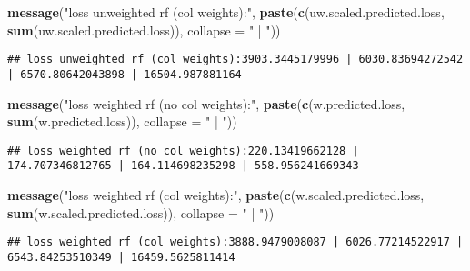 \documentclass[10pt]{report}
\newenvironment{Shaded}{}{}
\newcommand{\KeywordTok}[1]{\textcolor[rgb]{0.00,0.44,0.13}{\textbf{{#1}}}}
\newcommand{\DataTypeTok}[1]{\textcolor[rgb]{0.56,0.13,0.00}{{#1}}}
\newcommand{\StringTok}[1]{\textcolor[rgb]{0.25,0.44,0.63}{{#1}}}
\newcommand{\NormalTok}[1]{{#1}}
\begin{document}
\begin{Shaded}
\begin{Highlighting}[]
\KeywordTok{message}\NormalTok{(}\StringTok{"loss unweighted rf (col weights):"}\NormalTok{, }\KeywordTok{paste}\NormalTok{(}\KeywordTok{c}\NormalTok{(uw.scaled.predicted.loss, }
    \KeywordTok{sum}\NormalTok{(uw.scaled.predicted.loss)), }\DataTypeTok{collapse =} \StringTok{" | "}\NormalTok{))}
\end{Highlighting}
\end{Shaded}

\begin{verbatim}
## loss unweighted rf (col weights):3903.3445179996 | 6030.83694272542 | 6570.80642043898 | 16504.987881164
\end{verbatim}

\begin{Shaded}
\begin{Highlighting}[]
\KeywordTok{message}\NormalTok{(}\StringTok{"loss weighted rf (no col weights):"}\NormalTok{, }\KeywordTok{paste}\NormalTok{(}\KeywordTok{c}\NormalTok{(w.predicted.loss, }\KeywordTok{sum}\NormalTok{(w.predicted.loss)), }
    \DataTypeTok{collapse =} \StringTok{" | "}\NormalTok{))}
\end{Highlighting}
\end{Shaded}

\begin{verbatim}
## loss weighted rf (no col weights):220.13419662128 | 174.707346812765 | 164.114698235298 | 558.956241669343
\end{verbatim}

\begin{Shaded}
\begin{Highlighting}[]
\KeywordTok{message}\NormalTok{(}\StringTok{"loss weighted rf (col weights):"}\NormalTok{, }\KeywordTok{paste}\NormalTok{(}\KeywordTok{c}\NormalTok{(w.scaled.predicted.loss, }
    \KeywordTok{sum}\NormalTok{(w.scaled.predicted.loss)), }\DataTypeTok{collapse =} \StringTok{" | "}\NormalTok{))}
\end{Highlighting}
\end{Shaded}

\begin{verbatim}
## loss weighted rf (col weights):3888.9479008087 | 6026.77214522917 | 6543.84253510349 | 16459.5625811414
\end{verbatim}
\end{document}
